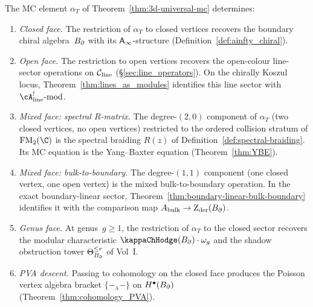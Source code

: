 \begin{proposition}
\label{prop:alpha-projections}
The MC element $\alpha_T$ of
Theorem~\textup{\ref{thm:3d-universal-mc}} determines:
\begin{enumerate}[label=\textup{(\roman*)}]
\item \emph{Closed face.} The restriction of $\alpha_T$ to
 closed vertices recovers the boundary chiral algebra~$B_{\partial}$
 with its $\mathsf{A}_{\infty}$-structure
 \textup{(}Definition~\textup{\ref{def:ainfty_chiral}}\textup{)}.
\item \emph{Open face.} The restriction to open vertices
 recovers the open-colour line-sector operations on
 $\mathcal C_{\mathrm{line}}$
 \textup{(}\S\textup{\ref{sec:line_operators}}\textup{)}. On the
 chirally Koszul locus, Theorem~\textup{\ref{thm:lines_as_modules}}
 identifies this line sector with
 $\cA^!_{\mathrm{line}}\text{-mod}$.
\item \emph{Mixed face: spectral $R$-matrix.} The degree-$(2,0)$
 component of $\alpha_T$ (two closed vertices, no open
 vertices) restricted to the ordered collision stratum of
 $\FM_2(\C)$ is the spectral braiding $R(z)$ of
 Definition~\textup{\ref{def:spectral-braiding}}. Its MC
 equation is the Yang--Baxter equation
 \textup{(}Theorem~\textup{\ref{thm:YBE}}\textup{)}.
\item \emph{Mixed face: bulk-to-boundary.} The degree-$(1,1)$
 component (one closed vertex, one open vertex) is the
 mixed bulk-to-boundary operation. In the exact boundary-linear
 sector, Theorem~\textup{\ref{thm:boundary-linear-bulk-boundary}}
 identifies it with the comparison map
 $A_{\mathrm{bulk}} \to \operatorname{Z}_{\mathrm{der}}(B_{\partial})$.
\item \emph{Genus face.} At genus~$g \ge 1$, the restriction
 of $\alpha_T$ to the closed sector recovers the modular
 characteristic $\kappaChHodge(\Bbound) \cdot \omega_g$ and the
 shadow obstruction tower $\Theta_{B_{\partial}}^{\le r}$ of Vol~I.
\item \emph{PVA descent.} Passing to cohomology on the closed
 face produces the Poisson vertex algebra bracket
 $\{-_\lambda-\}$ on $H^\bullet(B_{\partial})$
 \textup{(}Theorem~\textup{\ref{thm:cohomology_PVA}}\textup{)}.
\end{enumerate}
\end{proposition}

